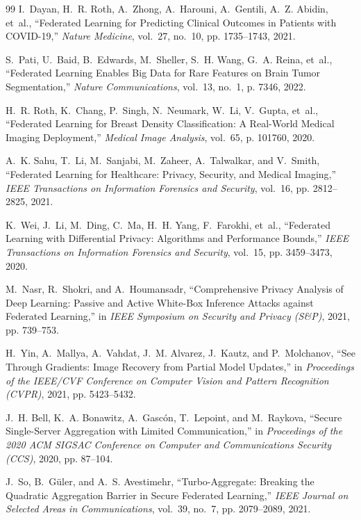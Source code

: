 \documentclass[12pt,a4paper]{report}
\begin{document}
\begin{thebibliography}{99}
I.~Dayan, H.~R. Roth, A.~Zhong, A.~Harouni, A.~Gentili, A.~Z. Abidin, et~al.,
``Federated Learning for Predicting Clinical Outcomes in Patients with COVID-19,''
\emph{Nature Medicine}, vol.~27, no.~10, pp. 1735--1743, 2021.

S.~Pati, U.~Baid, B.~Edwards, M.~Sheller, S.~H. Wang, G.~A. Reina, et~al.,
``Federated Learning Enables Big Data for Rare Features on Brain Tumor Segmentation,''
\emph{Nature Communications}, vol.~13, no.~1, p. 7346, 2022.

H.~R. Roth, K.~Chang, P.~Singh, N.~Neumark, W.~Li, V.~Gupta, et~al.,
``Federated Learning for Breast Density Classification: A Real-World Medical Imaging Deployment,''
\emph{Medical Image Analysis}, vol.~65, p. 101760, 2020.

A.~K. Sahu, T.~Li, M.~Sanjabi, M.~Zaheer, A.~Talwalkar, and V.~Smith,
``Federated Learning for Healthcare: Privacy, Security, and Medical Imaging,''
\emph{IEEE Transactions on Information Forensics and Security}, vol.~16, pp. 2812--2825, 2021.

K.~Wei, J.~Li, M.~Ding, C.~Ma, H.~H. Yang, F.~Farokhi, et~al.,
``Federated Learning with Differential Privacy: Algorithms and Performance Bounds,''
\emph{IEEE Transactions on Information Forensics and Security}, vol.~15, pp. 3459--3473, 2020.

M.~Nasr, R.~Shokri, and A.~Houmansadr,
``Comprehensive Privacy Analysis of Deep Learning: Passive and Active White-Box Inference Attacks against Federated Learning,''
in \emph{IEEE Symposium on Security and Privacy (S\&P)}, 2021, pp. 739--753.

H.~Yin, A.~Mallya, A.~Vahdat, J.~M. Alvarez, J.~Kautz, and P.~Molchanov,
``See Through Gradients: Image Recovery from Partial Model Updates,''
in \emph{Proceedings of the IEEE/CVF Conference on Computer Vision and Pattern Recognition (CVPR)}, 2021, pp. 5423--5432.

J.~H. Bell, K.~A. Bonawitz, A.~Gasc{\'o}n, T.~Lepoint, and M.~Raykova,
``Secure Single-Server Aggregation with Limited Communication,''
in \emph{Proceedings of the 2020 ACM SIGSAC Conference on Computer and Communications Security (CCS)}, 2020, pp. 87--104.

J.~So, B.~G{\"u}ler, and A.~S. Avestimehr,
``Turbo-Aggregate: Breaking the Quadratic Aggregation Barrier in Secure Federated Learning,''
\emph{IEEE Journal on Selected Areas in Communications}, vol.~39, no.~7, pp. 2079--2089, 2021.


\end{thebibliography}
\end{document}
